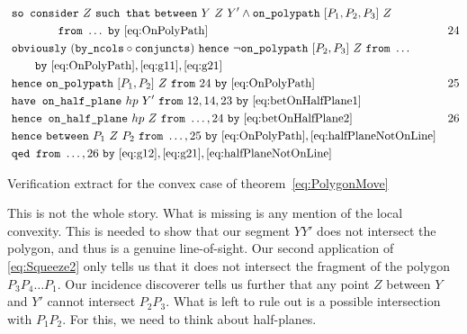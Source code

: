 \begin{boxedfigure}
\small
\begin{align*}
&\code{so consider}\ Z\ \code{such that}\ \between{Y}{Z}{Y'} \wedge \code{on\_polypath}\ [P_1,P_2,P_3]\ Z\\\
&\qquad\qquad\code{from}\ \ldots\ \code{by}\ \eqref{eq:OnPolyPath} & 24\\
&\code{obviously}\ (\code{by\_ncols}\circ\code{conjuncts})\ \code{hence}\ \neg\code{on\_polypath}\ [P_2,P_3]\ Z\ \code{from}\ \ldots\\
&\qquad\code{by}\ \eqref{eq:OnPolyPath},\eqref{eq:g11},\eqref{eq:g21}\\
&\code{hence}\ \code{on\_polypath}\ [P_1,P_2]\ Z\ \code{from}\ 24\ \code{by}\ \eqref{eq:OnPolyPath}&25\\
&\code{have on\_half\_plane}\ hp\ Y'\ \code{from}\ 12,14,23\ \code{by}\ \eqref{eq:betOnHalfPlane1}\\
&\code{hence on\_half\_plane}\ hp\ Z\ \code{from}\ \ldots,24\ \code{by}\ \eqref{eq:betOnHalfPlane2} & 26\\
&\code{hence}\ \between{P_1}{Z}{P_2}\ \code{from}\ \ldots,25\ \code{by}\ \eqref{eq:OnPolyPath},\eqref{eq:halfPlaneNotOnLine}\\
&\code{qed from}\ \ldots,26\ \code{by}\ \eqref{eq:g12},\eqref{eq:g21},\eqref{eq:halfPlaneNotOnLine}
\end{align*}
\caption{Verification extract for the convex case of theorem~\ref{eq:PolygonMove}}
\label{fig:ConvexVerification}
\end{boxedfigure}

This is not the whole story. What is missing is any mention of the local convexity. This is needed to show that our segment $YY'$ does not intersect the polygon, and thus is a genuine line-of-sight. Our second application of \eqref{eq:Squeeze2} only tells us that it does not intersect the fragment of the polygon $P_3P_4\ldots P_1$. Our incidence discoverer tells us further that any point $Z$ between $Y$ and $Y'$ cannot intersect $P_2P_3$. What is left to rule out is a possible intersection with $P_1P_2$. For this, we need to think about half-planes. 

